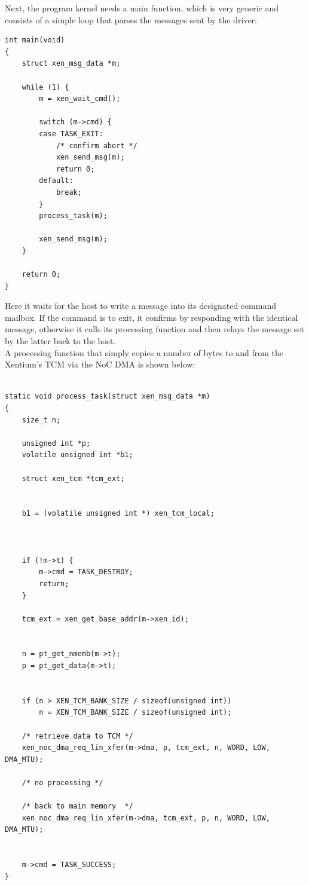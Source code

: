 \noindent
Next, the program kernel needs a main function, which is very generic and
consists of a simple loop that parses the messages sent by the driver:

\begin{minipage}{\linewidth}
\begin{lstlisting}
int main(void)
{
	struct xen_msg_data *m;

	while (1) {
		m = xen_wait_cmd();

		switch (m->cmd) {
		case TASK_EXIT:
			/* confirm abort */
			xen_send_msg(m);
			return 0;
		default:
			break;
		}
		process_task(m);

		xen_send_msg(m);
	}

	return 0;
}

\end{lstlisting}
\end{minipage}

\noindent
Here it waits for the host to write a message into its designated command
mailbox. If the command is to exit, it confirms by responding with the identical
message, otherwise it calls its processing function and then relays the message
set by the latter back to the host.
\\

\noindent
A processing function that simply copies a number of bytes to and from the
Xentium's \gls{TCM} via the \gls{NoC} \gls{DMA} is shown below:

\begin{minipage}{\linewidth}
\begin{lstlisting}

static void process_task(struct xen_msg_data *m)
{
	size_t n;

	unsigned int *p;
	volatile unsigned int *b1;

	struct xen_tcm *tcm_ext;


	b1 = (volatile unsigned int *) xen_tcm_local;



	if (!m->t) {
		m->cmd = TASK_DESTROY;
		return;
	}

	tcm_ext = xen_get_base_addr(m->xen_id);


	n = pt_get_nmemb(m->t);
	p = pt_get_data(m->t);


	if (n > XEN_TCM_BANK_SIZE / sizeof(unsigned int))
		n = XEN_TCM_BANK_SIZE / sizeof(unsigned int);

	/* retrieve data to TCM */
	xen_noc_dma_req_lin_xfer(m->dma, p, tcm_ext, n, WORD, LOW, DMA_MTU);

	/* no processing */

	/* back to main memory  */
	xen_noc_dma_req_lin_xfer(m->dma, tcm_ext, p, n, WORD, LOW, DMA_MTU);


	m->cmd = TASK_SUCCESS;
}

\end{lstlisting}
\end{minipage}

